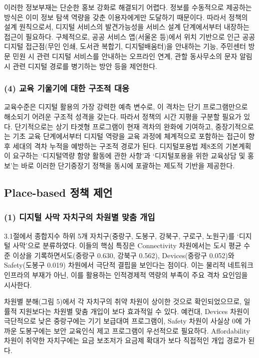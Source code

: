 이러한 정보부재는 단순한 홍보 강화로 해결되기 어렵다. 정보를 수동적으로 제공하는 방식은 이미 정보 탐색 역량을 갖춘 이용자에게만 도달하기 때문이다. 따라서 정책의 설계 원칙으로서, 디지털 서비스의 발견가능성을 서비스 설계 단계에서부터 내장하는 접근이 필요하다. 구체적으로, 공공 서비스 앱(서울온 등)에서 위치 기반으로 인근 공공 디지털 접근점(무인 인쇄, 도서관 복합기, 디지털배움터)을 안내하는 기능, 주민센터 방문 민원 시 관련 디지털 서비스를 안내하는 오프라인 연계, 관할 동사무소의 문자 알림 시 관련 디지털 경로를 병기하는 방안 등을 제언한다.

\subsubsection*{(4) 교육 기울기에 대한 구조적 대응}

교육수준은 디지털 활용의 가장 강력한 예측 변수로, 이 격차는 단기 프로그램만으로 해소되기 어려운 구조적 성격을 갖는다. 따라서 정책의 시간 지평을 구분할 필요가 있다. 단기적으로는 상기 타겟형 프로그램이 현재 격차의 완화에 기여하고, 중장기적으로는 기초 교육 단계에서부터 디지털 역량을 교육 과정에 체계적으로 포함하는 접근이 향후 세대의 격차 누적을 예방하는 구조적 경로가 된다. 디지털포용법 제8조의 기본계획이 요구하는 `디지털역량 함양 활동에 관한 사항'과 `디지털포용을 위한 교육\textperiodcentered{}상담 및 홍보'는 바로 이러한 단기\textperiodcentered{}중장기 정책을 동시에 포괄하는 제도적 기반을 제공한다.

\subsection{Place-based 정책 제언}
\label{subsec:4-3}

\subsubsection*{(1) 디지털 사막 자치구의 차원별 맞춤 개입}

3.1절에서 종합지수 하위 5개 자치구(중랑구, 도봉구, 강북구, 구로구, 노원구)를 `디지털 사막'으로 분류하였다. 이들의 핵심 특징은 Connectivity 차원에서는 도시 평균 수준 이상을 기록하면서도(중랑구 0.630, 강북구 0.562), Devices(중랑구 0.052)와 Safety(도봉구 0.019) 차원에서 극단적 결핍을 보인다는 점이다. 이는 물리적 네트워크 인프라의 부재가 아닌, 이를 활용하는 인적\textperiodcentered{}경제적 역량의 부족이 주요 격차 요인임을 시사한다.

차원별 분해(그림 5)에서 각 자치구의 취약 차원이 상이한 것으로 확인되었으므로, 일률적 지원보다는 차원별 맞춤 개입이 보다 효과적일 수 있다. 예컨대, Devices 차원이 극단적으로 낮은 중랑구에는 기기 보급\textperiodcentered{}대여 프로그램이, Safety 차원이 사실상 0에 가까운 도봉구에는 보안 교육\textperiodcentered{}인식 제고 프로그램이 우선적으로 필요하다. Affordability 차원이 취약한 자치구에는 요금 보조\textperiodcentered{}저가 요금제 확대가 보다 직접적인 개입 경로가 된다.

